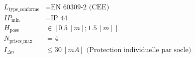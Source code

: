 \documentclass[a4paper,11pt,answers,addpoints]{exam}
\begin{document}
\begin{questions}
\begin{solution}
	\begin{align*}
		L_{\text{type\_conforme}} &= \text{EN 60309-2 (CEE)} \\[6pt]
		IP_{\text{min}} &= \text{IP 44} \\[6pt]
		H_{\text{pose}} &\in [\qty{0.5}{[m]} ; \qty{1.5}{[m]}] \\[6pt]
		N_{\text{prises\_max}} &= 4 \\[6pt]
		I_{\Delta n} &\leq \qty{30}{[mA]} \text{ (Protection individuelle par socle)}
	\end{align*}
\end{solution}
\end{questions}
\end{document}
